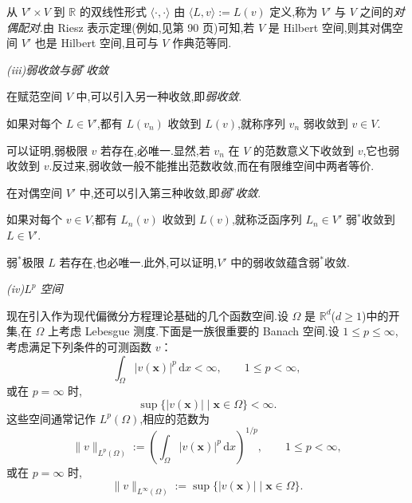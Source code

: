 从 \(V'\times V\) 到 \(\mathbb R\) 的双线性形式 \(\langle\cdot,\cdot\rangle\) 由 \(\langle L,v\rangle:=L(v)\) 定义,称为 \(V'\) 与 \(V\) 之间的\emph{对偶配对}.由 Riesz 表示定理(例如,见第 90 页)可知,若 \(V\) 是 Hilbert 空间,则其对偶空间 \(V'\) 也是 Hilbert 空间,且可与 \(V\) 作典范等同.

\medskip
\noindent\textit{(iii)弱收敛与弱\ensuremath{^*}收敛}

在赋范空间 \(V\) 中,可以引入另一种收敛,即\emph{弱收敛}.
\begin{definition*}[弱收敛]
如果对每个 \(L\in V'\),都有 \(L(v_n)\) 收敛到 \(L(v)\),就称序列 \(v_n\) 弱收敛到 \(v\in V\).
\end{definition*}
可以证明,弱极限 \(v\) 若存在,必唯一.显然,若 \(v_n\) 在 \(V\) 的范数意义下收敛到 \(v\),它也弱收敛到 \(v\).反过来,弱收敛一般不能推出范数收敛,而在有限维空间中两者等价.

在对偶空间 \(V'\) 中,还可以引入第三种收敛,即\emph{弱\ensuremath{^*}收敛}.
\begin{definition*}[弱\ensuremath{^*}收敛]
如果对每个 \(v\in V\),都有 \(L_n(v)\) 收敛到 \(L(v)\),就称泛函序列 \(L_n\in V'\) 弱\(^*\)收敛到 \(L\in V'\).
\end{definition*}
弱\(^*\)极限 \(L\) 若存在,也必唯一.此外,可以证明,\(V'\) 中的弱收敛蕴含弱\(^*\)收敛.

\medskip
\noindent\textit{(iv)\ensuremath{L^p} 空间}

现在引入作为现代偏微分方程理论基础的几个函数空间.设 \(\Omega\) 是 \(\mathbb R^d\)(\(d\ge 1\))中的开集,在 \(\Omega\) 上考虑 Lebesgue 测度.下面是一族很重要的 Banach 空间.设 \(1\le p\le\infty\),考虑满足下列条件的可测函数 \(v\)：
\begin{equation}\label{eq:1.2.3}
  \int_\Omega |v(\boldsymbol{x})|^p\,\mathrm dx<\infty,\qquad 1\le p<\infty,
\end{equation}
或在 \(p=\infty\) 时,
\begin{equation}\label{eq:1.2.4}
  \sup\bigl\{|v(\boldsymbol{x})|\mid\boldsymbol{x}\in\Omega\bigr\}<\infty.
\end{equation}
这些空间通常记作 \(L^p(\Omega)\),相应的范数为
\begin{equation}\label{eq:1.2.5}
  \|v\|_{L^p(\Omega)}:=\left(\int_\Omega |v(\boldsymbol{x})|^p\,\mathrm dx\right)^{1/p},
  \qquad 1\le p<\infty,
\end{equation}
或在 \(p=\infty\) 时,
\begin{equation}\label{eq:1.2.6}
  \|v\|_{L^\infty(\Omega)}:=\sup\bigl\{|v(\boldsymbol{x})|\mid\boldsymbol{x}\in\Omega\bigr\}.
\end{equation}


